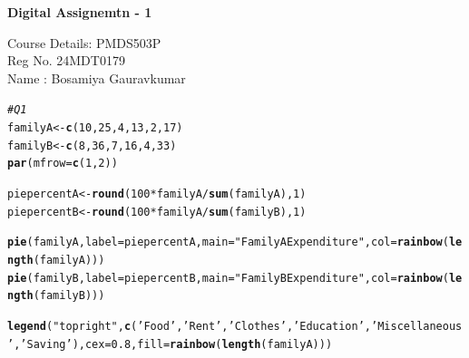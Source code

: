 \documentclass{article}\usepackage[]{graphicx}\usepackage[]{xcolor}
\makeatletter
\newcommand{\hlnum}[1]{\textcolor[rgb]{0.686,0.059,0.569}{#1}}%
\newcommand{\hlsng}[1]{\textcolor[rgb]{0.192,0.494,0.8}{#1}}%
\newcommand{\hlcom}[1]{\textcolor[rgb]{0.678,0.584,0.686}{\textit{#1}}}%
\newcommand{\hlopt}[1]{\textcolor[rgb]{0,0,0}{#1}}%
\newcommand{\hldef}[1]{\textcolor[rgb]{0.345,0.345,0.345}{#1}}%
\newcommand{\hlkwb}[1]{\textcolor[rgb]{0.69,0.353,0.396}{#1}}%
\newcommand{\hlkwc}[1]{\textcolor[rgb]{0.333,0.667,0.333}{#1}}%
\newcommand{\hlkwd}[1]{\textcolor[rgb]{0.737,0.353,0.396}{\textbf{#1}}}%
\newenvironment{kframe}{%
 \def\at@end@of@kframe{}%
 \ifinner\ifhmode%
  \def\at@end@of@kframe{\end{minipage}}%
  \begin{minipage}{\columnwidth}%
 \fi\fi%
 \def\FrameCommand##1{\hskip\@totalleftmargin \hskip-\fboxsep
 \colorbox{shadecolor}{##1}\hskip-\fboxsep
     \hskip-\linewidth \hskip-\@totalleftmargin \hskip\columnwidth}%
 \MakeFramed {\advance\hsize-\width
   \@totalleftmargin\z@ \linewidth\hsize
   \@setminipage}}%
 {\par\unskip\endMakeFramed%
 \at@end@of@kframe}
\newenvironment{knitrout}{}{} %
\makeatother
\begin{document}
\begin{center}
\Large{\textbf{Digital Assignemtn - 1}}
\newline

Course Details: PMDS503P  \\
Reg No. 24MDT0179 \\
Name : Bosamiya Gauravkumar \\
\end{center}
\begin{knitrout}
\color{fgcolor}\begin{kframe}
\begin{alltt}
\hlcom{#Q1}
\hldef{familyA} \hlkwb{<-} \hlkwd{c}\hldef{(}\hlnum{10}\hldef{,}\hlnum{25}\hldef{,}\hlnum{4}\hldef{,}\hlnum{13}\hldef{,}\hlnum{2}\hldef{,}\hlnum{17}\hldef{)}
\hldef{familyB} \hlkwb{<-} \hlkwd{c}\hldef{(}\hlnum{8}\hldef{,}\hlnum{36}\hldef{,}\hlnum{7}\hldef{,}\hlnum{16}\hldef{,}\hlnum{4}\hldef{,}\hlnum{33}\hldef{)}
\hlkwd{par}\hldef{(}\hlkwc{mfrow}\hldef{=}\hlkwd{c}\hldef{(}\hlnum{1}\hldef{,}\hlnum{2}\hldef{))}

\hldef{piepercentA}\hlkwb{<-} \hlkwd{round}\hldef{(}\hlnum{100}\hlopt{*}\hldef{familyA}\hlopt{/}\hlkwd{sum}\hldef{(familyA),} \hlnum{1}\hldef{)}
\hldef{piepercentB}\hlkwb{<-} \hlkwd{round}\hldef{(}\hlnum{100}\hlopt{*}\hldef{familyA}\hlopt{/}\hlkwd{sum}\hldef{(familyB),} \hlnum{1}\hldef{)}

\hlkwd{pie}\hldef{(familyA,} \hlkwc{label}\hldef{=piepercentA,} \hlkwc{main}\hldef{=}\hlsng{"Family A Expenditure"}\hldef{,}\hlkwc{col} \hldef{=} \hlkwd{rainbow}\hldef{(}\hlkwd{length}\hldef{(familyA)))}
\hlkwd{pie}\hldef{(familyB,} \hlkwc{label}\hldef{=piepercentB,} \hlkwc{main}\hldef{=}\hlsng{"Family B Expenditure"}\hldef{,}\hlkwc{col} \hldef{=} \hlkwd{rainbow}\hldef{(}\hlkwd{length}\hldef{(familyB)))}

\hlkwd{legend}\hldef{(}\hlsng{"topright"}\hldef{,} \hlkwd{c}\hldef{(}\hlsng{'Food'}\hldef{,}\hlsng{'Rent'}\hldef{,}\hlsng{'Clothes'}\hldef{,}\hlsng{'Education'}\hldef{,}\hlsng{'Miscellaneous'}\hldef{,} \hlsng{'Saving'}\hldef{),} \hlkwc{cex} \hldef{=} \hlnum{0.8}\hldef{,}\hlkwc{fill} \hldef{=} \hlkwd{rainbow}\hldef{(}\hlkwd{length}\hldef{(familyA)))}


\end{alltt}
\end{kframe}
\end{knitrout}
\end{document}
